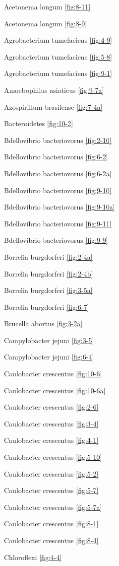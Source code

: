 \documentclass[]{tufte-book}
\begin{document}
Acetonema longum \ref{fig:8-11}

Acetonema longum \ref{fig:8-9}

Agrobacterium tumefaciens \ref{fig:4-9}

Agrobacterium tumefaciens \ref{fig:5-8}

Agrobacterium tumefaciens \ref{fig:9-1}

Amoebophilus asiaticus \ref{fig:9-7a}

Azospirillum brasilense \ref{fig:7-4a}

Bacteroidetes \ref{fig:10-2}

Bdellovibrio bacteriovorus \ref{fig:2-10}

Bdellovibrio bacteriovorus \ref{fig:6-2}

Bdellovibrio bacteriovorus \ref{fig:6-2a}

Bdellovibrio bacteriovorus \ref{fig:9-10}

Bdellovibrio bacteriovorus \ref{fig:9-10a}

Bdellovibrio bacteriovorus \ref{fig:9-11}

Bdellovibrio bacteriovorus \ref{fig:9-9}

Borrelia burgdorferi \ref{fig:2-4a}

Borrelia burgdorferi \ref{fig:2-4b}

Borrelia burgdorferi \ref{fig:3-5a}

Borrelia burgdorferi \ref{fig:6-7}

Brucella abortus \ref{fig:3-2a}

Campylobacter jejuni \ref{fig:3-5}

Campylobacter jejuni \ref{fig:6-4}

Caulobacter crescentus \ref{fig:10-6}

Caulobacter crescentus \ref{fig:10-6a}

Caulobacter crescentus \ref{fig:2-6}

Caulobacter crescentus \ref{fig:3-4}

Caulobacter crescentus \ref{fig:4-1}

Caulobacter crescentus \ref{fig:5-10}

Caulobacter crescentus \ref{fig:5-2}

Caulobacter crescentus \ref{fig:5-7}

Caulobacter crescentus \ref{fig:5-7a}

Caulobacter crescentus \ref{fig:8-1}

Caulobacter crescentus \ref{fig:8-4}

Chloroflexi \ref{fig:4-4}
\end{document}
